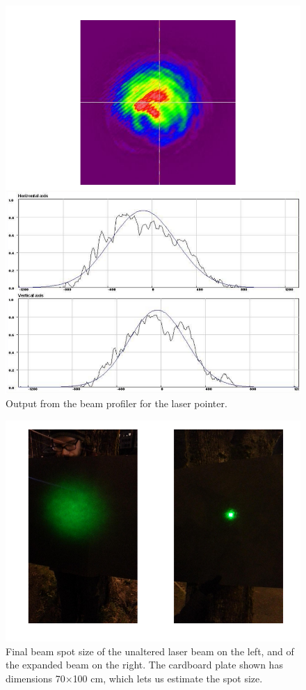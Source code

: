 \documentclass[a4paper, 11pt, notitlepage, english]{article}
\begin{document}
\begin{figure}[ht]
\centering
\includegraphics[width=\textwidth]{laserpen}  
\caption{Output from the beam profiler for the laser pointer.  \label{fig:lp_profile}}
\end{figure}


\begin{figure}[p]
\centering
\includegraphics[width=\textwidth]{experiment3}  
\caption{Final beam spot size of the unaltered laser beam on the left, and of the expanded beam on the right. The cardboard plate shown has dimensions 70$\times$100 cm, which lets us estimate the spot size. \label{fig:e3r2}}
\end{figure}
\end{document}
